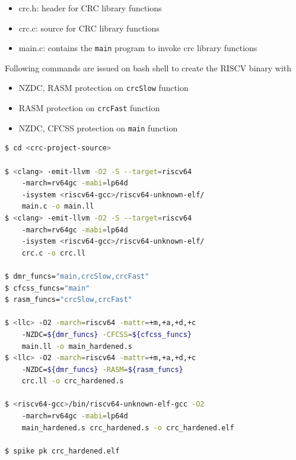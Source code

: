 \begin{itemize}
 \item{crc.h: header for CRC library functions}
 \item{crc.c: source for CRC library functions}
 \item{main.c: contains the \texttt{main} program to invoke crc library functions}
\end{itemize}

Following commands are issued on bash shell to create the RISCV binary with
\begin{itemize}
 \item NZDC, RASM protection on \texttt{crcSlow} function
 \item RASM protection on \texttt{crcFast} function
 \item NZDC, CFCSS protection on \texttt{main} function
\end{itemize}

\begin{framed}
 \begin{lstlisting}[language=bash, basicstyle=\small\ttfamily]
$ cd <crc-project-source>

$ <clang> -emit-llvm -O2 -S --target=riscv64
    -march=rv64gc -mabi=lp64d
    -isystem <riscv64-gcc>/riscv64-unknown-elf/
    main.c -o main.ll
$ <clang> -emit-llvm -O2 -S --target=riscv64
    -march=rv64gc -mabi=lp64d
    -isystem <riscv64-gcc>/riscv64-unknown-elf/
    crc.c -o crc.ll

$ dmr_funcs="main,crcSlow,crcFast"
$ cfcss_funcs="main"
$ rasm_funcs="crcSlow,crcFast"

$ <llc> -O2 -march=riscv64 -mattr=+m,+a,+d,+c
    -NZDC=${dmr_funcs} -CFCSS=${cfcss_funcs}
    main.ll -o main_hardened.s
$ <llc> -O2 -march=riscv64 -mattr=+m,+a,+d,+c
    -NZDC=${dmr_funcs} -RASM=${rasm_funcs}
    crc.ll -o crc_hardened.s

$ <riscv64-gcc>/bin/riscv64-unknown-elf-gcc -O2
    -march=rv64gc -mabi=lp64d
    main_hardened.s crc_hardened.s -o crc_hardened.elf

$ spike pk crc_hardened.elf

\end{lstlisting}
\end{framed}
